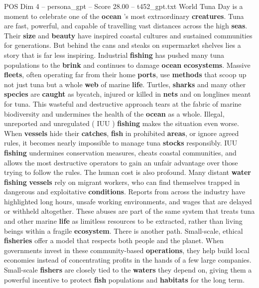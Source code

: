 \begin{textsample}{POS Dim 4 – persona\_gpt – Score 28.00 – t452\_gpt.txt}  \label{ex:f4_pos_026}
World Tuna Day is a moment to celebrate one of the \textbf{ocean} ’s most extraordinary \textbf{creatures}.
Tuna are fast, powerful, and capable of travelling vast distances across the high \textbf{seas}.
Their \textbf{size} and \textbf{beauty} have inspired coastal cultures and sustained communities for generations.
But behind the cans and steaks on supermarket shelves lies a story that is far less inspiring.
Industrial \textbf{fishing} has pushed many tuna populations to the \textbf{brink} and continues to damage \textbf{ocean} \textbf{ecosystems}.
Massive \textbf{fleets}, often operating far from their home \textbf{ports}, use \textbf{methods} that scoop up not just tuna but a whole \textbf{web} of marine \textbf{life}.
Turtles, \textbf{sharks} and many other \textbf{species} are \textbf{caught} as bycatch, injured or killed in \textbf{nets} and on longlines meant for tuna.
This wasteful and destructive approach tears at the fabric of marine biodiversity and undermines the health of the \textbf{ocean} as a whole.
Illegal, unreported and unregulated ( IUU ) \textbf{fishing} makes the situation even worse.
When \textbf{vessels} hide their \textbf{catches}, \textbf{fish} in prohibited \textbf{areas}, or ignore agreed rules, it becomes nearly impossible to manage tuna \textbf{stocks} responsibly.
IUU \textbf{fishing} undermines conservation measures, cheats coastal communities, and allows the most destructive operators to gain an unfair advantage over those trying to follow the rules.
The human cost is also profound.
Many distant \textbf{water} \textbf{fishing} \textbf{vessels} rely on migrant workers, who can find themselves trapped in dangerous and exploitative \textbf{conditions}.
Reports from across the industry have highlighted long hours, unsafe working environments, and wages that are delayed or withheld altogether.
These abuses are part of the same system that treats tuna and other marine \textbf{life} as limitless resources to be extracted, rather than living beings within a fragile \textbf{ecosystem}.
There is another path.
Small-scale, ethical \textbf{fisheries} offer a model that respects both people and the planet.
When governments invest in these community-based \textbf{operations}, they help build local economies instead of concentrating profits in the hands of a few large companies.
Small-scale \textbf{fishers} are closely tied to the \textbf{waters} they depend on, giving them a powerful incentive to protect \textbf{fish} populations and \textbf{habitats} for the long term.

\end{textsample}
